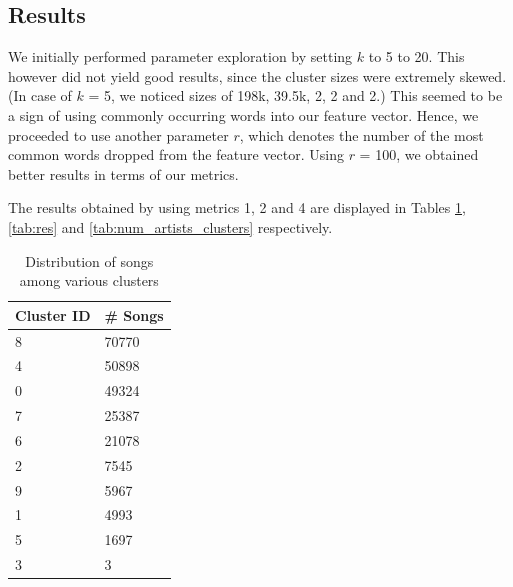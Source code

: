\documentclass[10pt,a4paper, twocolumn]{article}
\begin{document}
  \subsection{Results}
  We initially performed parameter exploration by setting $k$ to 5 to 20.
  This however did not yield good results, since the cluster sizes were extremely skewed.
  (In case of $k$ = 5, we noticed sizes of 198k, 39.5k, 2, 2 and 2.)
  This seemed to be a sign of using commonly occurring words into our feature vector.
  Hence, we proceeded to use another parameter $r$, which denotes the number of the most common words dropped from the feature vector.
  Using $r$ = 100, we obtained better results in terms of our metrics.
  
  The results obtained by using metrics 1, 2 and 4 are displayed in Tables \ref{tab:song_dis}, \ref{tab:res} and \ref{tab:num_artists_clusters} respectively.
  
\begin{table}[h]
\centering
\caption{Distribution of songs among various clusters}
\begin{tabular}{@{}ll@{}}
\toprule
Cluster ID & \# Songs \\ \midrule
8           & 70770      \\
4           & 50898      \\
0           & 49324      \\
7           & 25387      \\
6           & 21078      \\
2           & 7545       \\
9           & 5967       \\
1           & 4993       \\
5           & 1697       \\
3           & 3          \\ \bottomrule
\end{tabular}
\label{tab:song_dis}
\end{table}
  
\end{document}
